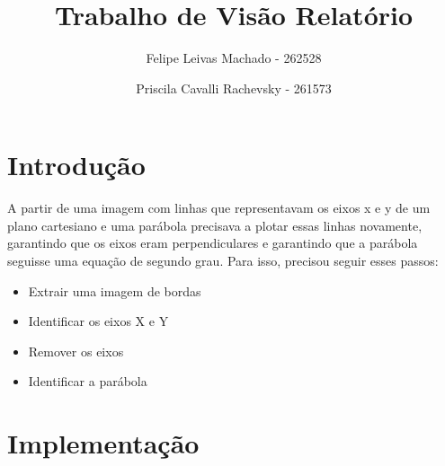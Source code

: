 \documentclass{article}
\title{Trabalho de Visão Relatório}
\author{Felipe Leivas Machado - 262528 \and Priscila Cavalli Rachevsky - 261573 }
\begin{document}
\maketitle

\section{Introdução}
    A partir de uma imagem com linhas que representavam os eixos x e y de um plano cartesiano e uma parábola precisava a plotar essas linhas novamente, garantindo que os eixos eram perpendiculares e garantindo que a parábola seguisse uma equação de segundo grau. Para isso, precisou seguir esses passos:
   \begin{itemize}
       \item Extrair uma imagem de bordas
       \item Identificar os eixos X e Y
       \item Remover os eixos
       \item Identificar a parábola
   \end{itemize}
\section{Implementação}
\end{document}
